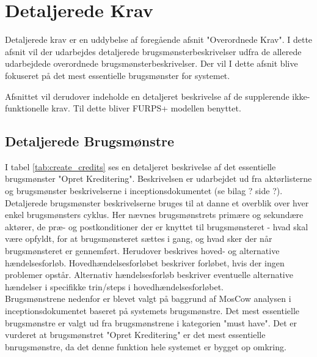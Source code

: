 \section{Detaljerede Krav}
\noindent
Detaljerede krav er en uddybelse af foregående afsnit "Overordnede Krav". I dette afsnit vil der udarbejdes detaljerede brugsmønsterbeskrivelser udfra de allerede udarbejdede overordnede brugsmønsterbeskrivelser. Der vil I dette afsnit blive fokuseret på det mest essentielle brugsmønster for systemet.

\noindent
Afsnittet vil derudover indeholde en detaljeret beskrivelse af de supplerende ikke-funktionelle krav. Til dette bliver FURPS+ modellen benyttet.


\subsection{Detaljerede Brugsmønstre} {\label{section: detailed_usemodels}}
I tabel \ref{tab:create_credits} ses en detaljeret beskrivelse af det essentielle brugsmønster "Opret Kreditering".
Beskrivelsen er udarbejdet ud fra aktørlisterne og brugsmønster beskrivelserne i inceptionsdokumentet (se bilag ? side ?). Detaljerede brugsmønster beskrivelserne bruges til at danne et overblik over hver enkel brugsmønsters cyklus. Her nævnes brugsmønstrets primære og sekundære aktører, de præ- og postkonditioner der er knyttet til brugsmønsteret - hvad skal være opfyldt, for at brugsmønsteret sættes i gang, og hvad sker der når brugsmønsteret er gennemført. Herudover beskrives hoved- og alternative hændelsesforløb. Hovedhændelsesforløbet beskriver forløbet, hvis der ingen problemer opstår. Alternativ hændelsesforløb beskriver eventuelle alternative hændelser i specifikke trin/steps i hovedhændelsesforløbet. \\

\noindent
Brugsmønstrene nedenfor er blevet valgt på baggrund af MosCow analysen i inceptionsdokumentet  baseret på systemets brugsmønstre. Det mest essentielle brugsmønstre er valgt ud fra brugsmønstrene i kategorien "must have". Det er vurderet at brugsmønstret "Opret Kreditering" er det mest essentielle bnrugsmønstre, da det denne funktion hele systemet er bygget op omkring.\\


